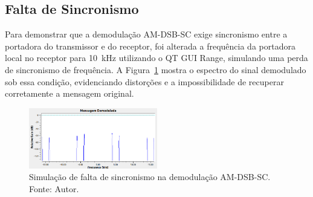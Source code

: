\subsection{Falta de Sincronismo}

Para demonstrar que a demodulação AM-DSB-SC exige sincronismo entre a portadora do transmissor e do receptor, foi alterada a frequência da portadora local no receptor para 10~kHz utilizando o QT GUI Range, simulando uma perda de sincronismo de frequência. A Figura~\ref{fig:falta_sincronismo_dsb} mostra o espectro do sinal demodulado sob essa condição, evidenciando distorções e a impossibilidade de recuperar corretamente a mensagem original.

\begin{figure}[h]
    \centering
    \includegraphics[width=0.5\textwidth]{images/falta_sincronismo_dsb.png}
    \caption{Simulação de falta de sincronismo na demodulação AM-DSB-SC. Fonte: Autor.}
    \label{fig:falta_sincronismo_dsb}
\end{figure}



